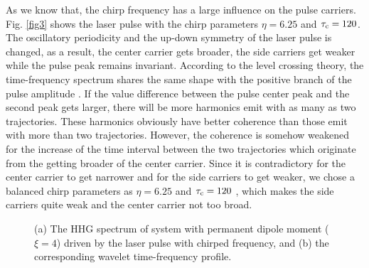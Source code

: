 \documentclass[10pt,letterpaper]{article}
\begin{document}
As we know that, the chirp frequency has a large influence on the pulse carriers. Fig. \ref{fig3} shows the laser pulse with the chirp parameters $ \eta=6.25 $ and $ \tau_{\rm{c}}=120$. The oscillatory periodicity and the up-down symmetry of the laser pulse is changed, as a result, the center carrier gets broader, the side carriers get weaker while the pulse peak remains invariant. According to the level crossing theory, the time-frequency spectrum shares the same shape with the positive branch of the pulse amplitude \cite{WANG-ZHONG-YANG-Two-Level-Attosecond-generation-1999}. If the value difference between the pulse center peak and the second peak gets larger, there will be more harmonics emit with as many as two trajectories. These harmonics obviously have better coherence than those emit with more than two trajectories. However, the coherence is somehow weakened for the increase of the time interval between the two trajectories which originate from the getting broader of the center carrier. Since it is contradictory for the center carrier to get narrower and for the side carriers to get weaker, we chose a balanced chirp parameters as  $ \eta=6.25 $ and $ \tau_{\rm{c}}=120 $ , which makes the side carriers quite weak and the center carrier not too broad. 

\begin{figure}[!htbp]
	\centering
	\caption{(a) The HHG spectrum of system with permanent dipole moment ($ \xi=4 $) driven by the laser pulse with chirped frequency, and (b) the corresponding wavelet time-frequency profile.}
	\label{fig4}
\end{figure}
\end{document}
